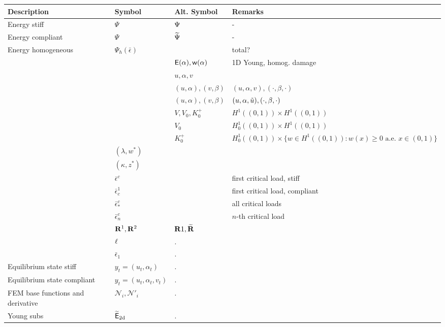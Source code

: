 \begin{table}[h!]
    \centering
    \begin{tabular}{  m{3.5cm}  m{3cm}  m{2.5cm}  m{6cm}  }
      \hline
      \textbf{Description} & \textbf{Symbol} & \textbf{Alt. Symbol} & \textbf{Remarks} \\
      \hline
      Energy stiff     & $\Psi$ & $\Psi$ & - \\
      Energy compliant & $\Psi$ & $\widetilde\Psi$ & - \\
      Energy homogeneous & $\Psi_h(\bar\epsilon)$ &  & total? \\
      & & $\mathsf E(\alpha), \mathsf{w}(\alpha)$ & 1D Young, homog. damage\\
      & & $u, \alpha, v$ & \\
      & & $(u,\alpha), (v, \beta)$ & $(u,\alpha, v), (\cdot, \beta, \cdot)$ \\
      & & $(u,\alpha), (v, \beta)$ & $(u,\alpha, \tilde u), (\cdot, \beta, \cdot)$ \\
      & & $V, V_0, K^+_0$ & $H^1((0,1))\times  H^1((0,1))$\\
      & & $V_0$ & $H^1_0((0,1))\times  H^1((0,1))$\\
      & & $K^+_0$ & $H^1_0((0, 1))\times \{w \in H^1((0, 1)): w(x) \geq 0 \text{ a.e. }x\in (0, 1)\}$\\
      & $(\lambda, w^*)$ &  & \\
      & $(\kappa, z^*)$ &  & \\
      & $\bar \epsilon^c$ &  & first critical load, stiff\\
      & $\bar \epsilon_c^1$ &  & first critical load, compliant \\
      & $\bar \epsilon^c_*$ &  & all critical loads \\
      & $\bar \epsilon^c_n$ &  & $n$-th critical load  \\
      & ${\bf R}^1, {\bf R}^2$ & ${\bf R}1, \widetilde{\bf R}$ & \\
      & $\ell$ & $.$ & \\
      & $\bar \epsilon_1$ & $.$ & \\
    Equilibrium state stiff& $y_t=(u_t, \alpha_t)$ & $.$ & \\
    Equilibrium state compliant & $y_t=(u_t, \alpha_t, v_t)$ & $.$ & \\
    FEM base functions and derivative  & ${\mathcal N}_i, {\mathcal N}'_i$ & $.$ & \\
     Young subs & ${\mathsf{\widetilde E_{\text{2d}}}}$ & $.$ & \\

\end{tabular}
\end{table}
